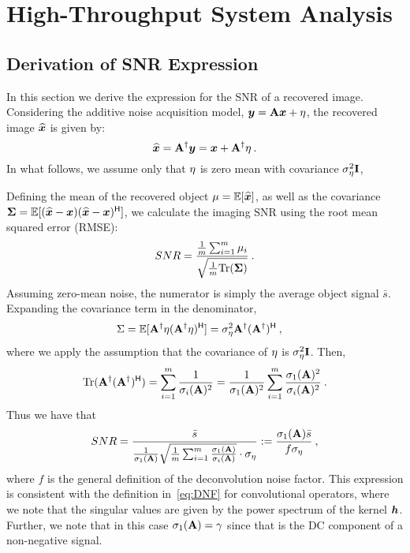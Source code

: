 \section{High-Throughput System Analysis} 
\label{sec:appendix:hightroughput}
\subsection{Derivation of SNR Expression}

\label{sec:appendix:snr_derivation}

In this section we derive the expression for the SNR of a recovered image. Considering the additive noise acquisition model, $\bm{y} = \mathbf{A}\bm{x} + {\eta}$, 
the recovered image $\widehat {\bm{x}}$ is given by:
\[\widehat {\bm{x}} =  \mathbf{A}^\dagger  \bm{y} = \bm{x} +  \mathbf{A}^\dagger  {\eta}\:.\]
In what follows, we assume only that ${\eta}$ is zero mean with covariance $\sigma_{\eta}^2 \mathbf{I}$,

Defining the mean of the recovered object $\mu = \mathbb{E}[\widehat {\bm{x}}]$, as well as the covariance $\mathbf\Sigma = \mathbb{E}[(\widehat {\bm{x}}-\bm{x}) (\widehat {\bm{x}}-\bm{x})^{\mathsf{H}}]$, we calculate the imaging SNR using the root mean squared error (RMSE):
\[SNR = \frac{\frac{1}{m}\sum_{i=1}^m\mu_i}{\sqrt{\frac{1}{m}\mathrm{Tr}(\mathbf\Sigma)}}\:.\]
Assuming zero-mean noise, the numerator is simply the average object signal $\bar s$.
Expanding the covariance term in the denominator,
\begin{align*}
    \Sigma &= \mathbb{E}[ \mathbf{A}^\dagger  {\eta}( \mathbf{A}^\dagger  {\eta})^{\mathsf{H}}]
    = \sigma_{ {\eta}}^2  \mathbf{A}^\dagger ( \mathbf{A}^\dagger)^{\mathsf{H}}\:,
\end{align*}
where we apply the assumption that the covariance of ${\eta}$ is $\sigma_{\eta}^2 \mathbf{I}$. Then,
\[\mathrm{Tr}( \mathbf{A}^\dagger ( \mathbf{A}^\dagger)^{\mathsf{H}} ) = \sum_{i=1}^m \frac{1}{\sigma_i( \mathbf{A})^2} = \frac{1}{\sigma_1(\mathbf{A})^2} \sum_{i=1}^m \frac{\sigma_1(\mathbf{A})^2}{\sigma_i(\mathbf{A})^2} \:.\]
Thus we have that
\[SNR = \frac{\bar s}{\frac{1}{\sigma_1(\mathbf{A})} \sqrt{\frac{1}{m}\sum_{i=1}^m \frac{\sigma_1(\mathbf{A})}{\sigma_i(\mathbf{A})}} \cdot\sigma_\eta} := \frac{\sigma_1(\mathbf{A}) \bar s }{ f\sigma_\eta }\:,\]
where $f$ is the general definition of the deconvolution noise factor. This expression is consistent with the definition in~\eqref{eq:DNF} for convolutional operators, where we note that the singular values are given by the power spectrum of the kernel $\bm{h}$. Further, we note that in this case $\sigma_1(\mathbf{A})=\gamma$ since that is the DC component of a non-negative signal.

